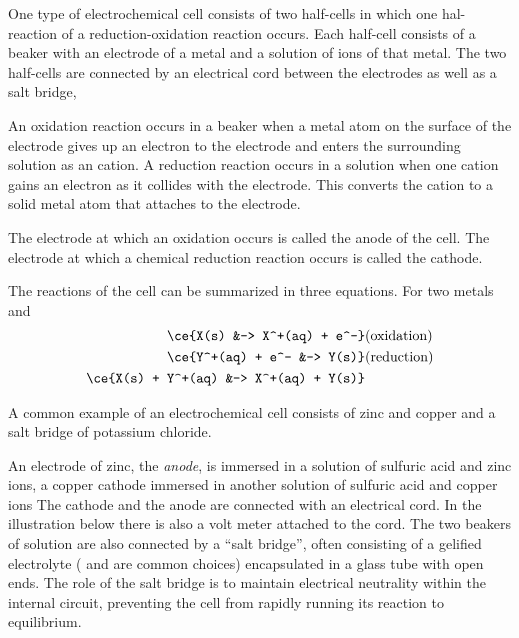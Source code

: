 \documentclass[../mit-general-chemistry.tex]{subfiles}
\begin{document}
One type of electrochemical cell consists of two half-cells in which
one hal-reaction of a reduction-oxidation reaction occurs. Each
half-cell consists of a beaker with an electrode of a metal and a
solution of ions of that metal. The two half-cells are connected by an
electrical cord between the electrodes as well as a salt bridge,

An oxidation reaction occurs in a beaker when a metal atom on the
surface of the electrode gives up an electron to the electrode and
enters the surrounding solution as an cation. A reduction reaction
occurs in a solution when one cation gains an electron as it collides
with the electrode. This converts the cation to a solid metal atom
that attaches to the electrode.

The electrode at which an oxidation occurs is called the anode of the
cell. The electrode at which a chemical reduction reaction occurs is
called the cathode.

The reactions of the cell can be summarized in three equations. For
two metals   and 
\begin{align*}
  \ce{X(s) &-> X^+(aq) + e^-}&\text{(oxidation)}\\
  \ce{Y^+(aq) + e^- &-> Y(s)}&\text{(reduction)}\\
  \ce{X(s) + Y^+(aq) &-> X^+(aq) + Y(s)}\\
\end{align*}


A common example of an electrochemical cell consists of zinc and
copper and a salt bridge of potassium chloride.

An electrode of zinc, the {\em anode}, is immersed in a solution of
sulfuric acid and zinc ions, a copper cathode immersed in another
solution of sulfuric acid and copper ions The cathode and the anode
are connected with an electrical cord. In the illustration below there
is also a volt meter attached to the cord. The two beakers of solution
are also connected by a ``salt bridge'', often consisting of a
gelified electrolyte ( and  are common choices)
encapsulated in a glass tube with open ends. The role of the salt
bridge is to maintain electrical neutrality within the internal
circuit, preventing the cell from rapidly running its reaction to
equilibrium.
\end{document}
